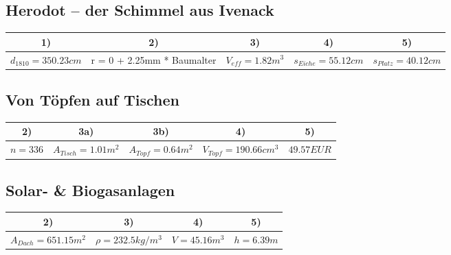 \documentclass[a4paper, 9pt]{scrartcl}\usepackage[]{graphicx}\usepackage[]{xcolor}
\newenvironment{knitrout}{}{} %
\begin{document}
\subsection*{Herodot – der Schimmel aus Ivenack}
\begin{knitrout}
\color{fgcolor}\begin{table}[!h]
\centering\begingroup\fontsize{10}{12}\selectfont

\begin{tabular}{ccccc}
\toprule
\textbf{1)} & \textbf{2)} & \textbf{3)} & \textbf{4)} & \textbf{5)}\\
\midrule
$d_{1810} = 350.23cm$ & r = 0 + 2.25mm * Baumalter & $V_{eff} = 1.82m^3$ & $s_{Eiche} = 55.12cm$ & $s_{Platz} = 40.12cm$\\
\bottomrule
\end{tabular}
\endgroup{}
\end{table}

\end{knitrout}
\subsection*{Von Töpfen auf Tischen}
\begin{knitrout}
\color{fgcolor}\begin{table}[!h]
\centering\begingroup\fontsize{10}{12}\selectfont

\begin{tabular}{ccccc}
\toprule
\textbf{2)} & \textbf{3a)} & \textbf{3b)} & \textbf{4)} & \textbf{5)}\\
\midrule
$n = 336$ & $A_{Tisch} = 1.01m^2$ & $A_{Topf} = 0.64m^2$ & $V_{Topf} = 190.66cm^3$ & $49.57EUR$\\
\bottomrule
\end{tabular}
\endgroup{}
\end{table}

\end{knitrout}
\subsection*{Solar- \& Biogasanlagen}
\begin{knitrout}
\color{fgcolor}\begin{table}[!h]
\centering\begingroup\fontsize{10}{12}\selectfont

\begin{tabular}{cccc}
\toprule
\textbf{2)} & \textbf{3)} & \textbf{4)} & \textbf{5)}\\
\midrule
$A_{Dach} = 651.15m^2$ & $\rho = 232.5kg/m^3$ & $V = 45.16m^3$ & $h = 6.39m$\\
\bottomrule
\end{tabular}
\endgroup{}
\end{table}

\end{knitrout}
\end{document}
